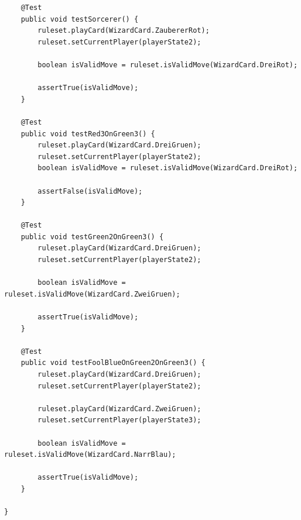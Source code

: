 \documentclass[twoside]{article}
\begin{document}
\begin{lstlisting}
	@Test
	public void testSorcerer() {
		ruleset.playCard(WizardCard.ZaubererRot);
		ruleset.setCurrentPlayer(playerState2);
		
		boolean isValidMove = ruleset.isValidMove(WizardCard.DreiRot);
		
		assertTrue(isValidMove);
	}
	
	@Test
	public void testRed3OnGreen3() {
		ruleset.playCard(WizardCard.DreiGruen);
		ruleset.setCurrentPlayer(playerState2);
		boolean isValidMove = ruleset.isValidMove(WizardCard.DreiRot);
		
		assertFalse(isValidMove);
	}
	
	@Test
	public void testGreen2OnGreen3() {
		ruleset.playCard(WizardCard.DreiGruen);
		ruleset.setCurrentPlayer(playerState2);
		
		boolean isValidMove = ruleset.isValidMove(WizardCard.ZweiGruen);
		
		assertTrue(isValidMove);
	}
	
	@Test
	public void testFoolBlueOnGreen2OnGreen3() {
		ruleset.playCard(WizardCard.DreiGruen);
		ruleset.setCurrentPlayer(playerState2);
		
		ruleset.playCard(WizardCard.ZweiGruen);
		ruleset.setCurrentPlayer(playerState3);
		
		boolean isValidMove = ruleset.isValidMove(WizardCard.NarrBlau);
		
		assertTrue(isValidMove);
	}

}
\end{lstlisting}
\end{document}
